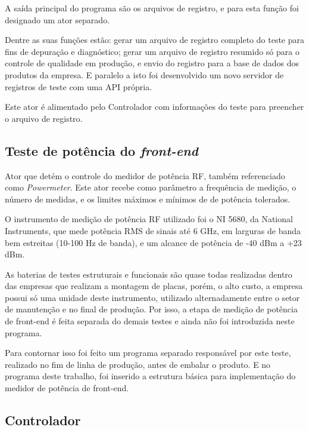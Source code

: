             A saída principal do programa são os arquivos de registro, e para esta função foi designado um ator separado. 
            
            Dentre as suas funções estão: gerar um arquivo de registro completo do teste para fins de depuração e diagnóstico; gerar um arquivo de registro resumido só para o controle de qualidade em produção, e envio do registro para a base de dados dos produtos da empresa. E paralelo a isto foi desenvolvido um novo servidor de registros de teste com uma API própria.
            
            Este ator é alimentado pelo Controlador com informações do teste para preencher o arquivo de registro. 
            
        \subsection{Teste de potência do \textit{front-end}}
            \label{pwmodel}
        
            Ator que detém o controle do medidor de potência RF, também referenciado como \textit{Powermeter}. Este ator recebe como parâmetro a frequência de medição, o número de medidas, e os limites máximos e mínimos de de potência tolerados.
            
            O instrumento de medição de potência RF utilizado foi o NI 5680, da National Instruments, que mede potência RMS de sinais até 6 GHz, em larguras de banda bem estreitas (10-100 Hz de banda), e um alcance de potência de -40 dBm a +23 dBm.
            
            As baterias de testes estruturais e funcionais são quase todas realizadas dentro das empresas que realizam a montagem de placas, porém, o alto custo, a empresa possui só uma unidade deste instrumento, utilizado alternadamente entre o setor de manutenção e no final de produção. Por isso, a etapa de medição de potência de front-end é feita separada do demais testes e ainda não foi introduzida neste programa. 
            
            Para contornar isso foi feito um programa separado responsável por este teste, realizado no fim de linha de produção, antes de embalar o produto. E no programa deste trabalho, foi inserido a estrutura básica para implementação do medidor de potência de front-end.
            
        \subsection{Controlador}
            
